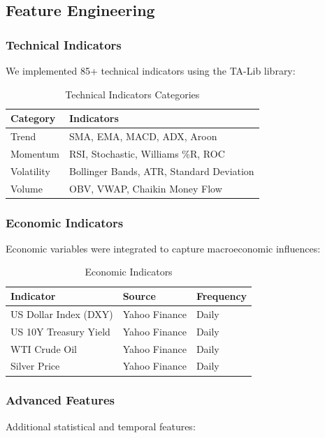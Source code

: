 \documentclass[12pt,a4paper]{article}
\begin{document}
\subsection{Feature Engineering}

\subsubsection{Technical Indicators}
We implemented 85+ technical indicators using the TA-Lib library:

\begin{table}[H]
\centering
\caption{Technical Indicators Categories}
\label{tab:technical_indicators}
\begin{tabular}{@{}ll@{}}
\toprule
Category & Indicators \\
\midrule
Trend & SMA, EMA, MACD, ADX, Aroon \\
Momentum & RSI, Stochastic, Williams \%R, ROC \\
Volatility & Bollinger Bands, ATR, Standard Deviation \\
Volume & OBV, VWAP, Chaikin Money Flow \\
\bottomrule
\end{tabular}
\end{table}

\subsubsection{Economic Indicators}
Economic variables were integrated to capture macroeconomic influences:

\begin{table}[H]
\centering
\caption{Economic Indicators}
\label{tab:economic_indicators}
\begin{tabular}{@{}lll@{}}
\toprule
Indicator & Source & Frequency \\
\midrule
US Dollar Index (DXY) & Yahoo Finance & Daily \\
US 10Y Treasury Yield & Yahoo Finance & Daily \\
WTI Crude Oil & Yahoo Finance & Daily \\
Silver Price & Yahoo Finance & Daily \\
\bottomrule
\end{tabular}
\end{table}

\subsubsection{Advanced Features}
Additional statistical and temporal features:
\end{document}
